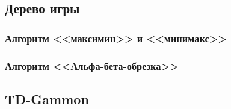 \documentclass{vsureport}
\begin{document}
\subsection{Дерево игры}


\subsubsection{Алгоритм <<максимин>> и <<минимакс>>}


\subsubsection{Алгоритм <<Альфа-бета-обрезка>>}


\subsection{TD-Gammon}





\end{document}
